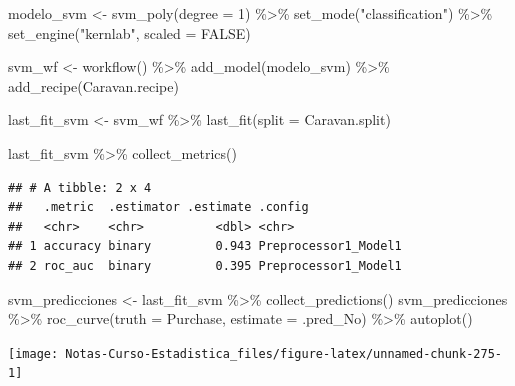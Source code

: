 \documentclass[
  12pt,
]{book}
\newenvironment{Shaded}{\begin{snugshade}}{\end{snugshade}}
\newcommand{\AttributeTok}[1]{\textcolor[rgb]{0.77,0.63,0.00}{#1}}
\newcommand{\ConstantTok}[1]{\textcolor[rgb]{0.00,0.00,0.00}{#1}}
\newcommand{\DecValTok}[1]{\textcolor[rgb]{0.00,0.00,0.81}{#1}}
\newcommand{\FunctionTok}[1]{\textcolor[rgb]{0.00,0.00,0.00}{#1}}
\newcommand{\NormalTok}[1]{#1}
\newcommand{\OtherTok}[1]{\textcolor[rgb]{0.56,0.35,0.01}{#1}}
\newcommand{\SpecialCharTok}[1]{\textcolor[rgb]{0.00,0.00,0.00}{#1}}
\newcommand{\StringTok}[1]{\textcolor[rgb]{0.31,0.60,0.02}{#1}}
\theoremstyle{definition}
\theoremstyle{definition}
\theoremstyle{definition}
\theoremstyle{definition}
\theoremstyle{remark}
\begin{document}
\begin{Shaded}
\begin{Highlighting}[]
\NormalTok{modelo\_svm }\OtherTok{\textless{}{-}} \FunctionTok{svm\_poly}\NormalTok{(}\AttributeTok{degree =} \DecValTok{1}\NormalTok{) }\SpecialCharTok{\%\textgreater{}\%}
    \FunctionTok{set\_mode}\NormalTok{(}\StringTok{"classification"}\NormalTok{) }\SpecialCharTok{\%\textgreater{}\%}
    \FunctionTok{set\_engine}\NormalTok{(}\StringTok{"kernlab"}\NormalTok{, }\AttributeTok{scaled =} \ConstantTok{FALSE}\NormalTok{)}

\NormalTok{svm\_wf }\OtherTok{\textless{}{-}} \FunctionTok{workflow}\NormalTok{() }\SpecialCharTok{\%\textgreater{}\%}
    \FunctionTok{add\_model}\NormalTok{(modelo\_svm) }\SpecialCharTok{\%\textgreater{}\%}
    \FunctionTok{add\_recipe}\NormalTok{(Caravan.recipe)}

\NormalTok{last\_fit\_svm }\OtherTok{\textless{}{-}}\NormalTok{ svm\_wf }\SpecialCharTok{\%\textgreater{}\%}
    \FunctionTok{last\_fit}\NormalTok{(}\AttributeTok{split =}\NormalTok{ Caravan.split)}

\NormalTok{last\_fit\_svm }\SpecialCharTok{\%\textgreater{}\%}
    \FunctionTok{collect\_metrics}\NormalTok{()}
\end{Highlighting}
\end{Shaded}

\begin{verbatim}
## # A tibble: 2 x 4
##   .metric  .estimator .estimate .config             
##   <chr>    <chr>          <dbl> <chr>               
## 1 accuracy binary         0.943 Preprocessor1_Model1
## 2 roc_auc  binary         0.395 Preprocessor1_Model1
\end{verbatim}

\begin{Shaded}
\begin{Highlighting}[]
\NormalTok{svm\_predicciones }\OtherTok{\textless{}{-}}\NormalTok{ last\_fit\_svm }\SpecialCharTok{\%\textgreater{}\%}
    \FunctionTok{collect\_predictions}\NormalTok{()}
\NormalTok{svm\_predicciones }\SpecialCharTok{\%\textgreater{}\%}
    \FunctionTok{roc\_curve}\NormalTok{(}\AttributeTok{truth =}\NormalTok{ Purchase, }\AttributeTok{estimate =}\NormalTok{ .pred\_No) }\SpecialCharTok{\%\textgreater{}\%}
    \FunctionTok{autoplot}\NormalTok{()}
\end{Highlighting}
\end{Shaded}

\begin{center}\texttt{[image: Notas-Curso-Estadistica\_files/figure-latex/unnamed-chunk-275-1]} \end{center}
\end{document}
